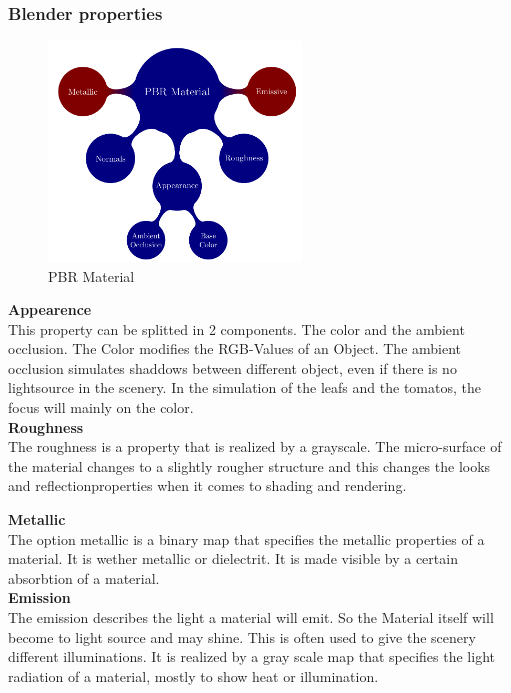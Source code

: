 \subsubsection{Blender properties}
\begin{figure}
	\centering
	\includegraphics[width=0.6\textwidth]{blender_properties.png}
	\caption{PBR Material}
	\label{pbr}
\end{figure}
\textbf{Appearence}\\
This property can be splitted in 2 components. The color and the ambient occlusion. The Color modifies the RGB-Values of an Object. The ambient occlusion simulates shaddows between different object, even if there is no lightsource in the scenery. In the simulation of the leafs and the tomatos, the focus will mainly on the color.\\


\textbf{Roughness}\\
The roughness is a property that is realized by a grayscale. The micro-surface of the material changes to a slightly rougher structure and this changes the looks and reflectionproperties when it comes to shading and rendering.

\textbf{Metallic}\\
The option metallic is a binary map that specifies the metallic properties of a material. It is wether metallic or dielectrit. It is made visible by a certain absorbtion of a material.\\


\textbf{Emission} \\
The emission describes the light a material will emit. So the Material itself will become to light source and may shine. This is often used to give the scenery different illuminations. It is realized by a gray scale map that specifies the light radiation of a material, mostly to show heat or illumination.\\


